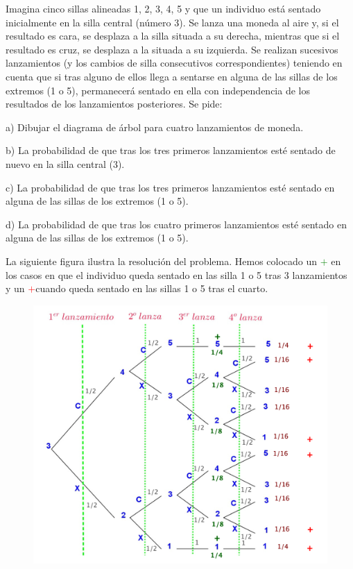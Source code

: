 \vspace{5mm}
\begin{ejemplo}
\begin{ejer}
Imagina cinco sillas alineadas 1, 2, 3, 4, 5 y que un individuo está sentado inicialmente en la silla central (número 3). Se lanza una moneda al aire y, si el resultado es cara, se desplaza a la silla situada a su derecha, mientras que si el resultado es cruz, se desplaza a la situada a su izquierda. Se realizan sucesivos lanzamientos (y los cambios de silla consecutivos correspondientes) teniendo en cuenta que si tras alguno de ellos llega a sentarse en alguna de las sillas de los extremos (1 o 5), permanecerá sentado en ella con independencia de los resultados de los lanzamientos posteriores. Se pide:

a) Dibujar el diagrama de árbol para cuatro lanzamientos de moneda.

b) La probabilidad de que tras los tres primeros lanzamientos esté sentado de nuevo en la silla central (3).

c) La probabilidad de que tras los tres primeros lanzamientos esté sentado en alguna de las sillas de los extremos (1 o 5).

d) La probabilidad de que tras los cuatro primeros lanzamientos esté sentado en alguna de las sillas de los extremos (1 o 5).
\end{ejer}
\end{ejemplo}

La siguiente figura ilustra la resolución del problema. Hemos colocado un \textcolor{green}{$\boldsymbol{+}$} en los casos en que el individuo queda sentado en las silla 1 o 5 tras 3 lanzamientos y un \textcolor{red}{$\boldsymbol{+}$}cuando queda sentado en las sillas 1 o 5 tras el cuarto.

	\begin{figure}[H]
		\centering
		\includegraphics[width=1\textwidth]{imagenes/imagenes02/T02IM52.png}
	\end{figure}
	
